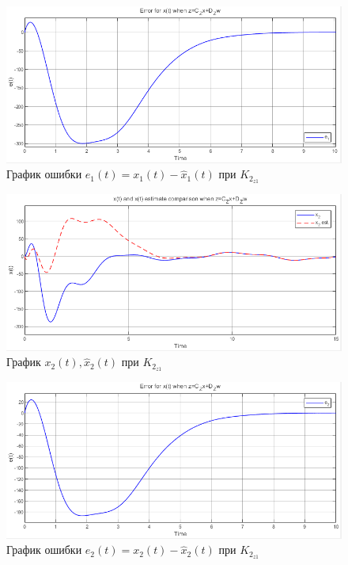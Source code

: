 \documentclass[a4paper, 12pt]{article}
\begin{document}
    \begin{figure}[H]
        \centering
        \includegraphics[scale=0.75]{3task_xe1czdz.png}
        \captionsetup{skip=0pt}
        \caption{График ошибки $e_1(t)=x_1(t)-\hat{x}_1(t)$ при $K_{2_{z1}}$}
        \label{fig:3task_xe1czdz}
    \end{figure}
    \begin{figure}[H]
        \centering
        \includegraphics[scale=0.75]{3task_xxh2czdz.png}
        \captionsetup{skip=0pt}
        \caption{График $x_2(t),\hat{x}_2(t)$ при $K_{2_{z1}}$}
        \label{fig:3task_xxh2czdz}
    \end{figure}
    \begin{figure}[H]
        \centering
        \includegraphics[scale=0.75]{3task_xe2czdz.png}
        \captionsetup{skip=0pt}
        \caption{График ошибки $e_2(t)=x_2(t)-\hat{x}_2(t)$ при $K_{2_{z1}}$}
        \label{fig:3task_xe2czdz}
    \end{figure}
\end{document}
